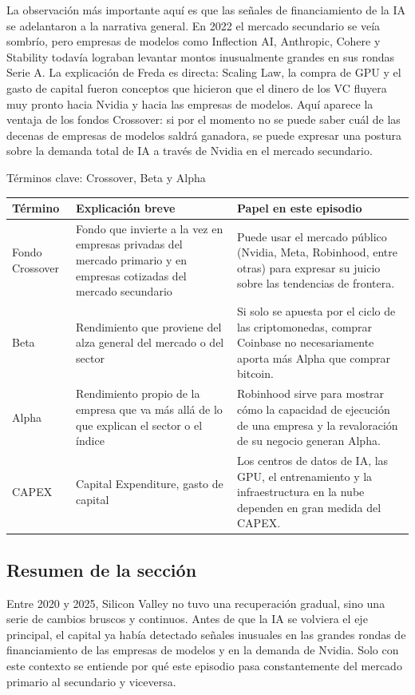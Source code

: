 \documentclass[a4paper]{article}
\begin{document}
La observación más importante aquí es que las señales de financiamiento de la IA se adelantaron a la narrativa general. En 2022 el mercado secundario se veía sombrío, pero empresas de modelos como Inflection AI, Anthropic, Cohere y Stability todavía lograban levantar montos inusualmente grandes en sus rondas Serie A. La explicación de Freda es directa: Scaling Law, la compra de GPU y el gasto de capital fueron conceptos que hicieron que el dinero de los VC fluyera muy pronto hacia Nvidia y hacia las empresas de modelos. Aquí aparece la ventaja de los fondos Crossover: si por el momento no se puede saber cuál de las decenas de empresas de modelos saldrá ganadora, se puede expresar una postura sobre la demanda total de IA a través de Nvidia en el mercado secundario.

\begin{knowledgebox}{Términos clave: Crossover, Beta y Alpha}
\begin{tabularx}{\textwidth}{p{}p{}X}
\toprule
Término & Explicación breve & Papel en este episodio \\
\midrule
Fondo Crossover & Fondo que invierte a la vez en empresas privadas del mercado primario y en empresas cotizadas del mercado secundario & Puede usar el mercado público (Nvidia, Meta, Robinhood, entre otras) para expresar su juicio sobre las tendencias de frontera. \\
Beta & Rendimiento que proviene del alza general del mercado o del sector & Si solo se apuesta por el ciclo de las criptomonedas, comprar Coinbase no necesariamente aporta más Alpha que comprar bitcoin. \\
Alpha & Rendimiento propio de la empresa que va más allá de lo que explican el sector o el índice & Robinhood sirve para mostrar cómo la capacidad de ejecución de una empresa y la revaloración de su negocio generan Alpha. \\
CAPEX & Capital Expenditure, gasto de capital & Los centros de datos de IA, las GPU, el entrenamiento y la infraestructura en la nube dependen en gran medida del CAPEX. \\
\bottomrule
\end{tabularx}
\end{knowledgebox}

\subsection{Resumen de la sección}

Entre 2020 y 2025, Silicon Valley no tuvo una recuperación gradual, sino una serie de cambios bruscos y continuos. Antes de que la IA se volviera el eje principal, el capital ya había detectado señales inusuales en las grandes rondas de financiamiento de las empresas de modelos y en la demanda de Nvidia. Solo con este contexto se entiende por qué este episodio pasa constantemente del mercado primario al secundario y viceversa.
\end{document}
